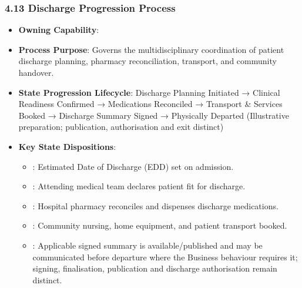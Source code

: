 \par\smallskip
{}\label{rad:processes:263}
\subsubsection*{4.13 Discharge Progression Process}
\label{rad:processes:264}

\begin{itemize}

\item
\textbf{Owning Capability}: \texttt{}



\item
\textbf{Process Purpose}: Governs the multidisciplinary coordination of patient discharge planning, pharmacy reconciliation, transport, and community handover.



\item
\textbf{State Progression Lifecycle}: Discharge Planning Initiated → Clinical Readiness Confirmed → Medications Reconciled → Transport \& Services Booked → Discharge Summary Signed → Physically Departed   (Illustrative preparation; publication, authorisation and exit distinct)



\item
\textbf{Key State Dispositions}:


\begin{itemize}

\item
\texttt{}: Estimated Date of Discharge (EDD) set on admission.



\item
\texttt{}: Attending medical team declares patient fit for discharge.



\item
\texttt{}: Hospital pharmacy reconciles and dispenses discharge medications.



\item
\texttt{}: Community nursing, home equipment, and patient transport booked.



\item
\texttt{}: Applicable signed summary is available/\allowbreak{}published and may be communicated before departure where the Business behaviour requires it; signing, finalisation, publication and discharge authorisation remain distinct.




\end{itemize}
\end{itemize}

